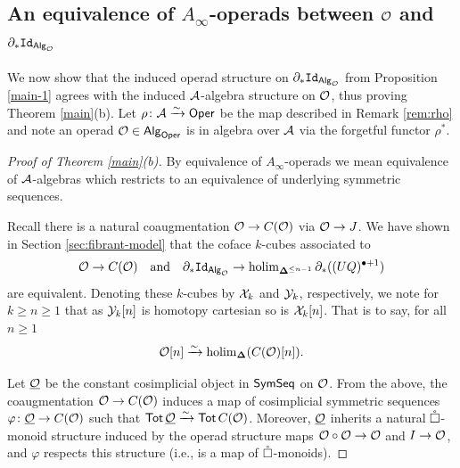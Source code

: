 \subsection{An equivalence of $A_{\infty}$-operads between $\mathcal{O}$ and $\partial_* \mathtt{Id}_{{\mathsf{Alg}_{\mathcal{O}}}}$} \label{O-and-dern-equiv}
We now show that the induced operad structure on $\partial_* \mathtt{Id}_{{\mathsf{Alg}_{\mathcal{O}}}}$ from Proposition \ref{main-1} agrees with the induced $\mathcal{A}$-algebra structure on $\mathcal{O}$, thus proving Theorem \ref{main}(b). Let $\rho \colon \mathcal{A}\xrightarrow{\sim} \mathsf{Oper}$ be the map described in Remark \ref{rem:rho} and note an operad $\mathcal{O}\in {\mathsf{Alg}_{\mathcal{\mathsf{Oper}}}}$ is in algebra over $\mathcal{A}$ via the forgetful functor $\rho^*$.


\begin{proof}[Proof of Theorem \ref{main}(b)]
     By equivalence of $A_{\infty}$-operads we mean equivalence of $\mathcal{A}$-algebras which restricts to an equivalence of underlying symmetric sequences. 
     
     Recall there is a natural coaugmentation $\mathcal{O}\to C(\mathcal{O})$ via $\mathcal{O}\to J$. We have shown in Section \ref{sec:fibrant-model} that the coface $k$-cubes associated to \[ \mathcal{O}\to C(\mathcal{O}) \quad \text{and} \quad \partial_*\mathtt{Id}_{{\mathsf{Alg}_{\mathcal{O}}}}\to \operatorname{holim}_{\mathbf{\Delta}^{\leq n-1}} \partial_* ( (UQ)^{\bullet+1})\]  are equivalent. Denoting these $k$-cubes by $\mathcal{X}_k$ and $\mathcal{Y}_k$, respectively, we note for $k\geq n\geq 1$ that as $\mathcal{Y}_k[n]$ is homotopy cartesian so is $\mathcal{X}_k[n]$. That is to say, for all $n\geq 1$ \begin{equation*}
    \label{On-->der_n}
        \mathcal{O}[n] \xrightarrow{\sim} \operatorname{holim}_{\mathbf{\Delta}}(  C(\mathcal{O})[n]).
    \end{equation*}
    
    Let $\underline{\mathcal{O}}$ be the constant cosimplicial object in $\mathsf{SymSeq}$ on $\mathcal{O}$. From the above, the coaugmentation $\mathcal{O}\to C(\mathcal{O})$ induces a map of cosimplicial symmetric sequences $\varphi\colon \underline{\mathcal{O}} \to  C(\mathcal{O})$ such that  $\operatorname{\mathsf{Tot}} \underline{\mathcal{O}} \xrightarrow{\sim} \operatorname{\mathsf{Tot}} C(\mathcal{O})$. Moreover, $\underline{\mathcal{O}}$ inherits a natural $\mathring{\square}$-monoid structure induced by the operad structure maps $\mathcal{O}\circ\mathcal{O}\to\mathcal{O}$ and $I\to \mathcal{O}$, and $\varphi$ respects this structure (i.e., is a map of $\mathring{\square}$-monoids).
    

\end{proof}
